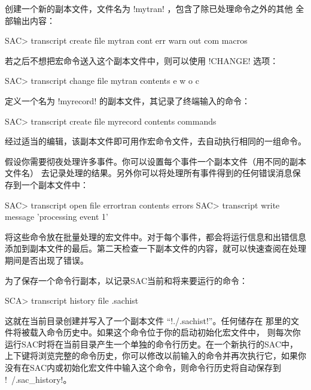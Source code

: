 创建一个新的副本文件，文件名为 !mytran! ，包含了除已处理命令之外的其他
全部输出内容：
\begin{SACCode}
SAC> transcript create file mytran cont err warn out com macros
\end{SACCode}

若之后不想把宏命令送入这个副本文件中，则可以使用 !CHANGE! 选项：
\begin{SACCode}
SAC> transcript change file mytran contents e w o c
\end{SACCode}

定义一个名为 !myrecord! 的副本文件，其记录了终端输入的命令：
\begin{SACCode}
SAC> transcript create file myrecord contents commands
\end{SACCode}
经过适当的编辑，该副本文件即可用作宏命令文件，去自动执行相同的一组命令。

假设你需要彻夜处理许多事件。你可以设置每个事件一个副本文件（用不同的副本文件名）
去记录处理的结果。另外你可以将处理所有事件得到的任何错误消息保存到一个副本文件中：
\begin{SACCode}
SAC> transcript open file errortran contents errors
SAC> transcript write message 'processing event 1'
\end{SACCode}
将这些命令放在批量处理的宏文件中。对于每个事件，都会将运行信息和出错信息
添加到副本文件的最后。第二天检查一下副本文件的内容，就可以快速查阅在处理
期间是否出现了错误。

为了保存一个命令行副本，以记录SAC当前和将来要运行的命令：
\begin{SACCode}
SCA> transcript history file .sachist
\end{SACCode}
这就在当前目录创建并写入了一个副本文件 ``!./.sachist!''。任何储存在
那里的文件将被载入命令历史中。如果这个命令位于你的启动初始化宏文件中，
则每次你运行SAC时将在当前目录产生一个单独的命令行历史。在一个新执行的SAC中，
上下键将浏览完整的命令历史，你可以修改以前输入的命令并再次执行它，如果你
没有在SAC内或初始化宏文件中输入这个命令，则命令行历史将自动保存到
!~/.sac_history!。
